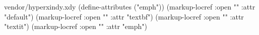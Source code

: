 \begin{filecontents*}{vendor/hyperxindy.xdy}
(define-attributes ("emph"))
(markup-locref :open "" :attr "default")
(markup-locref :open "\textbf{}" :attr "textbf")
(markup-locref :open "\textit{}" :attr "textit")
(markup-locref :open "\emph{}" :attr "emph")
\end{filecontents*}

\usepackage[xindy]{imakeidx} %


\makeindex[
  options=-C utf8 -M vendor/hyperxindy.xdy,
  intoc,
]




\usepackage{verbatim}

\usepackage{latexsym}
\usepackage{amsmath}
\usepackage{amssymb}
\usepackage{mathtools}



\usepackage{csquotes}

